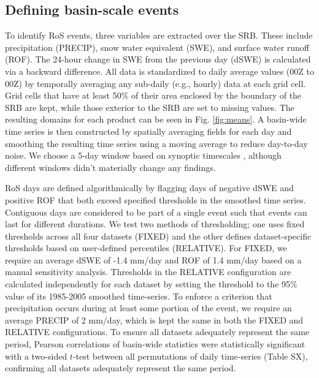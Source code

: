 \documentclass[draft]{agujournal2019}
\begin{document}
\subsection{Defining basin-scale events}

To identify RoS events, three variables are extracted over the SRB. 
These include precipitation (PRECIP), snow water equivalent (SWE), and surface water runoff (ROF). 
The 24-hour change in SWE from the previous day (dSWE) is calculated via a backward difference. 
All data is standardized to daily average values (00Z to 00Z) by temporally averaging any sub-daily (e.g., hourly) data at each grid cell.
Grid cells that have at least 50\% of their area enclosed by the boundary of the SRB are kept, while those exterior to the SRB  are set to missing values. 
The resulting domains for each product can be seen in Fig. \ref{fig:means}. A basin-wide time series is then constructed by spatially averaging fields for each day and smoothing the resulting time series using a moving average to reduce day-to-day noise. 
We choose a 5-day window based on synoptic timescales \citep{holton2004introduction}, although different windows didn't materially change any findings.

RoS days are defined algorithmically by flagging days of negative dSWE and positive ROF that both exceed specified thresholds in the smoothed time series. Contiguous days are considered to be part of a single event such that events can last for different durations.
We test two methods of thresholding; one uses fixed thresholds across all four datasets (FIXED) and the other defines dataset-specific thresholds based on user-defined percentiles (RELATIVE).
For FIXED, we require an average dSWE of -1.4 mm/day and ROF of 1.4 mm/day based on a manual sensitivity analysis. Thresholds in the RELATIVE configuration are calculated independently for each dataset by setting the threshold to the 95\% value of its 1985-2005 smoothed time-series. To enforce a criterion that precipitation occurs during at least some portion of the event, we require an average PRECIP of 2 mm/day, which is kept the same in both the FIXED and RELATIVE configurations.
To ensure all datasets adequately represent the same period, Pearson correlations of basin-wide statistics were statistically significant with a two-sided $t$-test between all permutations of daily time-series (Table SX), confirming all datasets adequately represent the same period.

\end{document}
